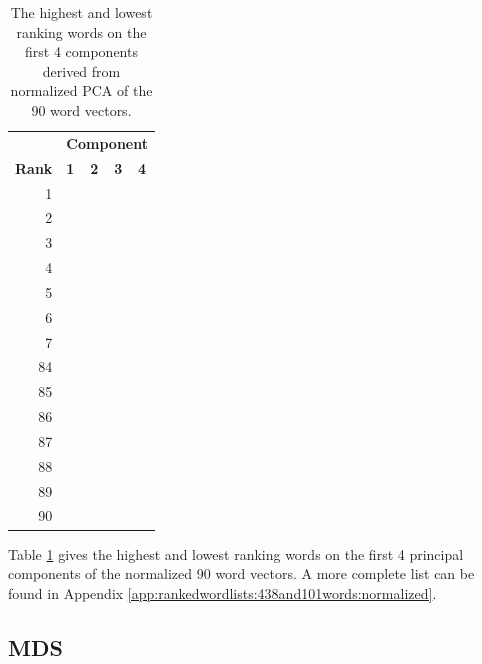 \documentclass[10pt,letterpaper]{book}
\begin{document}
\begin{table}[!htbp]
    \begin{tabular}{| rllll | }
        \hline
         & \multicolumn{4}{c|}{\textbf{Component}} \\
        \textbf{Rank} & \textbf{1} & \textbf{2} & \textbf{3} & \textbf{4} \\
        \hline
        1 &  &  &  &  \\
        2 &  &  &  &  \\
        3 &  &  &  &  \\
        4 &  &  &  &  \\
        5 &  &  &  &  \\
        6 &  &  &  &  \\
        7 &  &  &  &  \\
        \hline
        84 &  &  &  &  \\
        85 &  &  &  &  \\
        86 &  &  &  &  \\
        87 &  &  &  &  \\
        88 &  &  &  &  \\
        89 &  &  &  &  \\
        90 &  &  &  &  \\
        \hline
    \end{tabular}
    \caption{The highest and lowest ranking words on the first 4 components 
    derived from normalized PCA of the 90 word vectors.}
    \label{tab:438and101wordsRankingsNormalizedPCA}
\end{table}

Table \ref{tab:438and101wordsRankingsNormalizedPCA} gives the highest and lowest
ranking words on the first 4 principal components of the normalized 90 word 
vectors. A more complete list can be found in Appendix 
\ref{app:rankedwordlists:438and101words:normalized}.


\subsection{MDS}
\end{document}
